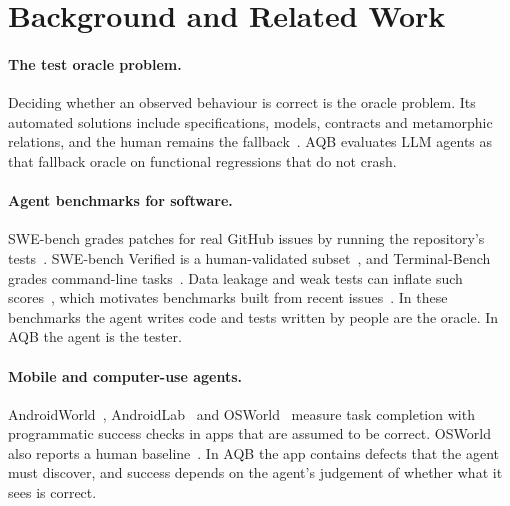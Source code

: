 \documentclass[sigconf]{acmart}
\newcommand{\aqb}{AQB\xspace}
\begin{document}
\section{Background and Related Work}
\label{sec:related}

\paragraph{The test oracle problem.}
Deciding whether an observed behaviour is correct is the oracle problem. Its automated solutions
include specifications, models, contracts and metamorphic relations, and the human remains the
fallback~\cite{barr2015oracle}. \aqb evaluates LLM agents as that fallback oracle on functional
regressions that do not crash.

\paragraph{Agent benchmarks for software.}
SWE-bench grades patches for real GitHub issues by running the repository's
tests~\cite{jimenez2024swebench}. SWE-bench Verified is a human-validated
subset~\cite{openai2024sweverified}, and Terminal-Bench grades command-line
tasks~\cite{merrill2026terminalbench}. Data leakage and weak tests can inflate such
scores~\cite{aleithan2024swebenchplus}, which motivates benchmarks built from recent
issues~\cite{zhang2025swebenchlive}. In these benchmarks the agent writes code and tests written by
people are the oracle. In \aqb the agent is the tester.

\paragraph{Mobile and computer-use agents.}
AndroidWorld~\cite{rawles2025androidworld}, AndroidLab~\cite{xu2025androidlab} and
OSWorld~\cite{xie2024osworld} measure task completion with programmatic success checks in apps that
are assumed to be correct. OSWorld also reports a human baseline~\cite{xie2024osworld}. In \aqb the
app contains defects that the agent must discover, and success depends on the agent's judgement of
whether what it sees is correct.
\end{document}

